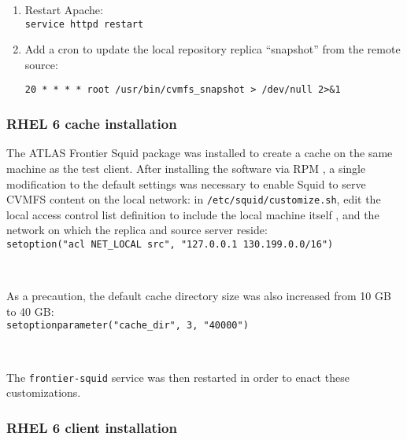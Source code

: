 \documentclass{article}
\begin{document}
\begin{enumerate}
    \item Restart Apache: \\
    \verb+service httpd restart+

    \item Add a cron to update the local repository replica “snapshot” from the remote source:\\
    \begin{verbatim}
20 * * * * root /usr/bin/cvmfs_snapshot > /dev/null 2>&1
    \end{verbatim}

\end{enumerate}


\subsubsection{RHEL 6 cache installation} 

The ATLAS Frontier Squid package was installed to create a cache on the same machine as the test client.  
After installing the software via RPM , 
a single modification to the default settings was necessary to enable Squid to serve CVMFS content on the local network: 
in \verb+/etc/squid/customize.sh+, 
edit the local access control list definition to include the local machine itself
, and the network on which the replica and source server reside: \\
\verb+setoption("acl NET_LOCAL src", "127.0.0.1 130.199.0.0/16")+

~

As a precaution, the default cache directory size was also increased from 10 GB to 40 GB: \\
\verb+setoptionparameter("cache_dir", 3, "40000")+

~

The \verb+frontier-squid+ service was then restarted in order to enact these customizations.  


\subsubsection{RHEL 6 client installation} 
\end{document}
